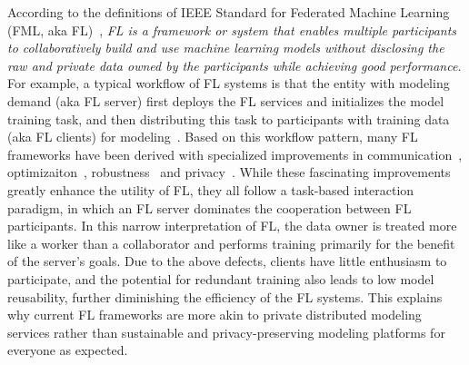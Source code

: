 According to the definitions of IEEE Standard for Federated Machine Learning (FML, aka FL)~\cite{IEEEstd3652}, \textit{FL is a framework or system that enables multiple participants to collaboratively build and use machine learning models without disclosing the raw and private data owned by the participants while achieving good performance.}
For example, a typical workflow of FL systems is that the entity with modeling demand (aka FL server) first deploys the FL services and initializes the model training task, and then distributing this task  to participants with training data (aka FL clients) for modeling~\cite{bonawitz2019towards}.
Based on this workflow pattern, many FL frameworks have been derived with specialized improvements in communication~\cite{konevcny2016federated, mcmahan2017communication, xu2021asynchronous}, optimizaiton~\cite{li2018federated, karimireddy2020scaffold, li2021model}, robustness~\cite{duan2020self, sattler2019robust, li2022federated} and privacy~\cite{bonawitz2017practical, geyer2017differentially, cheng2021secureboost}.
While these fascinating improvements greatly enhance the utility of FL, they all follow a task-based interaction paradigm, in which an FL server dominates the cooperation between FL participants.
In this narrow interpretation of FL, the data owner is treated more like a worker than a collaborator and performs training primarily for the benefit of the server's goals.
Due to the above defects, clients have little enthusiasm to participate, and the potential for redundant training also leads to low model reusability, further diminishing the efficiency of the FL systems.
This explains why current FL frameworks are more akin to private distributed modeling services rather than sustainable and privacy-preserving modeling platforms for everyone as expected.

